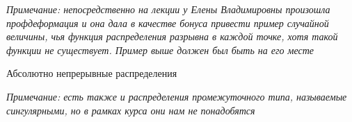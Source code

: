 \textit{Примечание: непосредственно на лекции у Елены Владимировны произошла профдеформация и она дала в качестве бонуса привести пример случайной величины, чья функция распределения разрывна в каждой точке, хотя такой функции не существует. Пример выше должен был быть на его месте}
\newpage

\begin{center}
    \huge Абсолютно непрерывные распределения 
\end{center}
\textit{Примечание: есть также и распределения промежуточного типа, называемые сингулярными, но в рамках курса они нам не понадобятся}
\newpage

